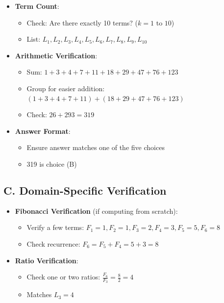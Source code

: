 \documentclass[12pt]{article}
\begin{document}
\begin{verificationbox}
\begin{itemize}[leftmargin=*]
    \item \textbf{Term Count}:
    \begin{itemize}
        \item Check: Are there exactly 10 terms? ($k = 1$ to $10$)
        \item List: $L_1, L_2, L_3, L_4, L_5, L_6, L_7, L_8, L_9, L_{10}$
    \end{itemize}
    
    \item \textbf{Arithmetic Verification}:
    \begin{itemize}
        \item Sum: $1 + 3 + 4 + 7 + 11 + 18 + 29 + 47 + 76 + 123$
        \item Group for easier addition: $(1+3+4+7+11) + (18+29+47+76+123)$
        \item Check: $26 + 293 = 319$ \checkmark
    \end{itemize}
    
    \item \textbf{Answer Format}:
    \begin{itemize}
        \item Ensure answer matches one of the five choices
        \item 319 is choice (B) \checkmark
    \end{itemize}
\end{itemize}

\subsection*{C. Domain-Specific Verification}
\begin{itemize}[leftmargin=*]
    \item \textbf{Fibonacci Verification} (if computing from scratch):
    \begin{itemize}
        \item Verify a few terms: $F_1=1, F_2=1, F_3=2, F_4=3, F_5=5, F_6=8$
        \item Check recurrence: $F_6 = F_5 + F_4 = 5 + 3 = 8$ \checkmark
    \end{itemize}
    
    \item \textbf{Ratio Verification}:
    \begin{itemize}
        \item Check one or two ratios: $\frac{F_6}{F_3} = \frac{8}{2} = 4$ \checkmark
        \item Matches $L_3 = 4$ \checkmark
    \end{itemize}
    

\end{itemize}
\end{verificationbox}
\end{document}
